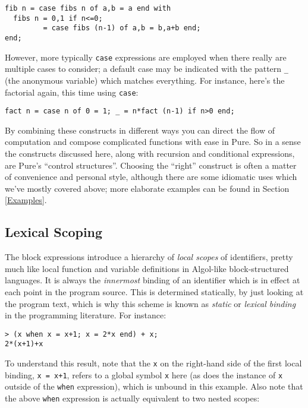 \documentclass[a4paper,12pt]{article}
\begin{document}
\begin{lstlisting}
fib n = case fibs n of a,b = a end with
  fibs n = 0,1 if n<=0;
         = case fibs (n-1) of a,b = b,a+b end;
end;
\end{lstlisting}

However, more typically \lstinline{case} expressions are employed when there really are multiple cases to consider; a default case may be indicated with the pattern \verb|_| (the anonymous variable) which matches everything. For instance, here's the factorial again, this time using \lstinline{case}:

\begin{lstlisting}
fact n = case n of 0 = 1; _ = n*fact (n-1) if n>0 end;
\end{lstlisting}

By combining these constructs in different ways you can direct the flow of computation and compose complicated functions with ease in Pure. So in a sense the constructs discussed here, along with recursion and conditional expressions, are Pure's ``control structures''. Choosing the ``right'' construct is often a matter of convenience and personal style, although there are some idiomatic uses which we've mostly covered above; more elaborate examples can be found in Section \ref{Examples}.

\subsection{Lexical Scoping}
\label{Lexical Scoping}

The block expressions introduce a hierarchy of \emph{local scopes} of identifiers, pretty much like local function and variable definitions in Algol-like block-structured languages. It is always the \emph{innermost} binding of an identifier which is in effect at each point in the program source. This is determined statically, by just looking at the program text, which is why this scheme is known as \emph{static} or \emph{lexical binding} in the programming literature. For instance:

\begin{lstlisting}
> (x when x = x+1; x = 2*x end) + x;
2*(x+1)+x
\end{lstlisting}

To understand this result, note that the \verb|x| on the right-hand side of the first local binding, \lstinline{x = x+1}, refers to a global symbol \verb|x| here (as does the instance of \verb|x| outside of the \lstinline{when} expression), which is unbound in this example. Also note that the above \lstinline{when} expression is actually equivalent to two nested scopes:
\end{document}
